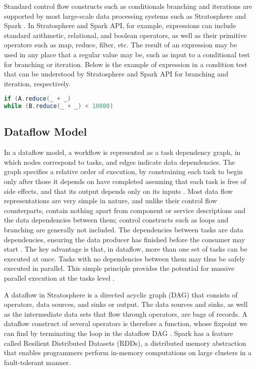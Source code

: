 Standard control flow constructs such as conditionals branching and iterations are supported by most large-scale data processing systems such as Stratosphere \cite{alexandrov2011mapreduce} and Spark \cite{zaharia2010spark}. In Stratosphere and Spark API, for example, expressions can include standard arithmetic, relational, and boolean operators, as well as their primitive operators such as map, reduce, filter, etc. The result of an expression may be used in any place that a regular value may be, such as input to a conditional test for branching or iteration. Below is the example of expression in a condition test that can be understood by Stratosphere and Spark API for branching and iteration, respectively.
\begin{lstlisting}[language=scala, label = controlflow]
if (A.reduce(_ + _)
while (B.reduce(_ + _) < 10000)
\end{lstlisting} 

\subsection{Dataflow Model}

In a dataflow model, a workflow is represented as a task dependency graph, in which nodes correspond to tasks, and edges indicate data dependencies. The graph specifies a relative order of execution, by constraining each task to begin only after those it depends on have completed assuming that each task is free of side effects, and that its output depends only on its inputs \cite{kelly2011applying}. Most data flow representations are very simple in nature, and unlike their control flow counterparts, contain nothing apart from component or service descriptions and the data dependencies between them; control constructs such as loops and branching are generally not included. The dependencies between tasks are data dependencies, ensuring the data producer has finished before the consumer may start \cite{deelman2009workflows}. The key advantage is that, in dataflow, more than one set of tasks can be executed at once. Tasks with no dependencies between them may thus be safely executed in parallel. This simple principle provides the potential for massive parallel execution at the tasks level \cite{johnston2004advances}.

A dataflow in Stratosphere is a directed acyclic graph (DAG) that consists of operators, data sources, and sinks or output. The data sources and sinks, as well as the intermediate data sets that flow through operators, are bags of records. A dataflow construct of several operators is therefore a function, whose fixpoint we can find by terminating the loop in the dataflow DAG \cite{ewen2012spinning}. Spark has a feature called Resilient Distributed Datasets (RDDs), a distributed memory abstraction that enables programmers perform in-memory computations on large clusters in a fault-tolerant manner\cite{zaharia2012resilient}.

